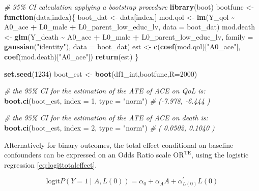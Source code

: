 \documentclass[
]{book}
\newenvironment{Shaded}{\begin{snugshade}}{\end{snugshade}}
\newcommand{\AttributeTok}[1]{\textcolor[rgb]{0.13,0.29,0.53}{#1}}
\newcommand{\CommentTok}[1]{\textcolor[rgb]{0.56,0.35,0.01}{\textit{#1}}}
\newcommand{\ControlFlowTok}[1]{\textcolor[rgb]{0.13,0.29,0.53}{\textbf{#1}}}
\newcommand{\DecValTok}[1]{\textcolor[rgb]{0.00,0.00,0.81}{#1}}
\newcommand{\FunctionTok}[1]{\textcolor[rgb]{0.13,0.29,0.53}{\textbf{#1}}}
\newcommand{\NormalTok}[1]{#1}
\newcommand{\OtherTok}[1]{\textcolor[rgb]{0.56,0.35,0.01}{#1}}
\newcommand{\SpecialCharTok}[1]{\textcolor[rgb]{0.81,0.36,0.00}{\textbf{#1}}}
\newcommand{\StringTok}[1]{\textcolor[rgb]{0.31,0.60,0.02}{#1}}
\begin{document}
\begin{Shaded}
\begin{Highlighting}[]
\CommentTok{\# 95\% CI calculation applying a bootstrap procedure}
\FunctionTok{library}\NormalTok{(boot)}
\NormalTok{bootfunc }\OtherTok{\textless{}{-}} \ControlFlowTok{function}\NormalTok{(data,index)\{}
\NormalTok{  boot\_dat }\OtherTok{\textless{}{-}}\NormalTok{ data[index,]}
\NormalTok{  mod.qol }\OtherTok{\textless{}{-}} \FunctionTok{lm}\NormalTok{(Y\_qol }\SpecialCharTok{\textasciitilde{}}\NormalTok{ A0\_ace }\SpecialCharTok{+}\NormalTok{ L0\_male }\SpecialCharTok{+}\NormalTok{ L0\_parent\_low\_educ\_lv,}
                \AttributeTok{data =}\NormalTok{ boot\_dat)}
\NormalTok{  mod.death }\OtherTok{\textless{}{-}} \FunctionTok{glm}\NormalTok{(Y\_death }\SpecialCharTok{\textasciitilde{}}\NormalTok{ A0\_ace }\SpecialCharTok{+}\NormalTok{ L0\_male }\SpecialCharTok{+}\NormalTok{ L0\_parent\_low\_educ\_lv,}
                   \AttributeTok{family =} \FunctionTok{gaussian}\NormalTok{(}\StringTok{"identity"}\NormalTok{),}
                   \AttributeTok{data =}\NormalTok{ boot\_dat)}
\NormalTok{  est }\OtherTok{\textless{}{-}} \FunctionTok{c}\NormalTok{(}\FunctionTok{coef}\NormalTok{(mod.qol)[}\StringTok{"A0\_ace"}\NormalTok{],}
           \FunctionTok{coef}\NormalTok{(mod.death)[}\StringTok{"A0\_ace"}\NormalTok{])}
  \FunctionTok{return}\NormalTok{(est)}
\NormalTok{\}}

\FunctionTok{set.seed}\NormalTok{(}\DecValTok{1234}\NormalTok{)}
\NormalTok{boot\_est }\OtherTok{\textless{}{-}} \FunctionTok{boot}\NormalTok{(df1\_int,bootfunc,}\AttributeTok{R=}\DecValTok{2000}\NormalTok{)}

\CommentTok{\# the 95\% CI for the estimation of the ATE of ACE on QoL is:}
\FunctionTok{boot.ci}\NormalTok{(boot\_est, }\AttributeTok{index =} \DecValTok{1}\NormalTok{, }\AttributeTok{type =} \StringTok{"norm"}\NormalTok{)}
\CommentTok{\# ({-}7.978, {-}6.444 )}

\CommentTok{\# the 95\% CI for the estimation of the ATE of ACE on death is:}
\FunctionTok{boot.ci}\NormalTok{(boot\_est, }\AttributeTok{index =} \DecValTok{2}\NormalTok{, }\AttributeTok{type =} \StringTok{"norm"}\NormalTok{)}
\CommentTok{\# ( 0.0502,  0.1040 )  }
\end{Highlighting}
\end{Shaded}

Alternatively for binary outcomes, the total effect conditional on baseline confounders can be expressed on an Odds Ratio scale \(\text{OR}^{\text{TE}}\), using the logistic regression \eqref{eq:logittotaleffect}.

\begin{equation} 
  \text{logit} P(Y = 1 \mid A, L(0)) = \alpha_0 + \alpha_A A + \alpha_{L(0)}^\prime L(0) 
  \label{eq:logittotaleffect}
\end{equation}
\end{document}
